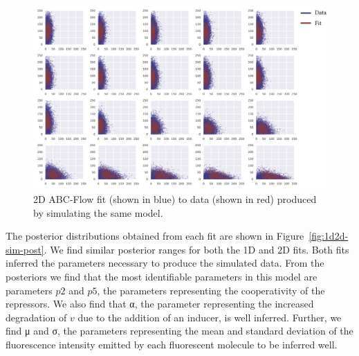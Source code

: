 \begin{figure}[htbp]
\centering
\includegraphics[scale=0.7]{../../chapters/chapterABCFlow/images/2D_toy_e3.png}
\caption[Applying ABC-Flow to 2D simulated data]{\label{fig:2d-sim-res}2D ABC-Flow fit (shown in blue) to data (shown in red) produced by simulating the same model. }
\end{figure}

%
%
%
%





The posterior distributions obtained from each fit are shown in Figure~\ref{fig:1d2d-sim-post}. We find similar posterior ranges for both the 1D and 2D fits. Both fits inferred the parameters necessary to produce the simulated data. From the posteriors we find that the most identifiable parameters in this model are parameters $p2$ and $p5$, the parameters representing the cooperativity of the repressors. We also find that α, the parameter representing the increased degradation of $v$ due to the addition of an inducer, is well inferred. Further, we find μ and σ, the parameters representing the mean and standard deviation of the fluorescence intensity emitted by each fluorescent molecule to be inferred well. 

